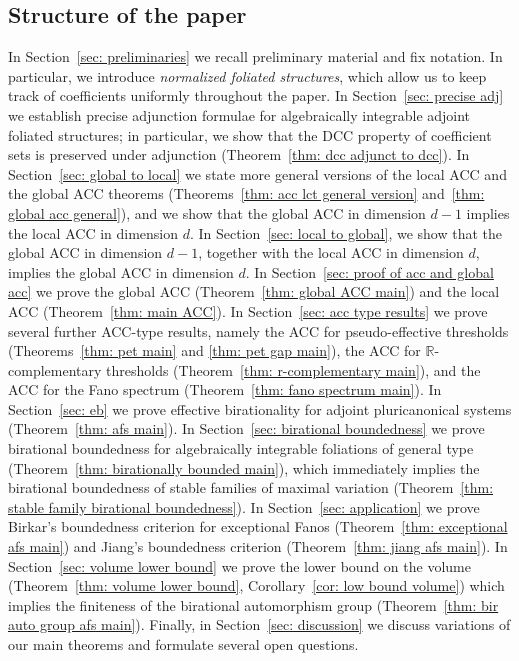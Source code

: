 \documentclass[11pt,reqno]{amsart}
\numberwithin{equation}{section}
\theoremstyle{definition}
\begin{document}
\subsection*{Structure of the paper}
In Section~\ref{sec: preliminaries} we recall preliminary material and fix notation. In particular, we introduce \emph{normalized foliated structures}, which allow us to keep track of coefficients uniformly throughout the paper. In Section~\ref{sec: precise adj} we establish precise adjunction formulae for algebraically integrable adjoint foliated structures; in particular, we show that the DCC property of coefficient sets is preserved under adjunction (Theorem~\ref{thm: dcc adjunct to dcc}). In Section~\ref{sec: global to local} we state more general versions of the local ACC and the global ACC theorems (Theorems~\ref{thm: acc lct general version} and~\ref{thm: global acc general}), and we show that the global ACC in dimension $d-1$ implies the local ACC in dimension $d$. In Section~\ref{sec: local to global}, we show that the global ACC in dimension $d-1$, together with the local ACC in dimension $d$, implies the global ACC in dimension $d$. In Section~\ref{sec: proof of acc and global acc} we prove the global ACC (Theorem~\ref{thm: global ACC main}) and the local ACC (Theorem~\ref{thm: main ACC}). In Section~\ref{sec: acc type results} we prove several further ACC-type results, namely the ACC for pseudo-effective thresholds (Theorems~\ref{thm: pet main} and \ref{thm: pet gap main}), the ACC for $\mathbb R$-complementary thresholds (Theorem~\ref{thm: r-complementary main}), and the ACC for the Fano spectrum (Theorem~\ref{thm: fano spectrum main}). In Section~\ref{sec: eb} we prove effective birationality for adjoint pluricanonical systems (Theorem~\ref{thm: afs main}). In Section~\ref{sec: birational boundedness} we prove birational boundedness for algebraically integrable foliations of general type (Theorem~\ref{thm: birationally bounded main}), which immediately implies the birational boundedness of stable families of maximal variation (Theorem~\ref{thm: stable family birational boundedness}). In Section~\ref{sec: application} we prove Birkar's boundedness criterion for exceptional Fanos (Theorem~\ref{thm: exceptional afs main}) and Jiang's boundedness criterion (Theorem~\ref{thm: jiang afs main}). In Section~\ref{sec: volume lower bound} we prove the lower bound on the volume (Theorem~\ref{thm: volume lower bound}, Corollary~\ref{cor: low bound volume}) which implies the finiteness of the birational automorphism group (Theorem~\ref{thm: bir auto group afs main}). Finally, in Section~\ref{sec: discussion} we discuss variations of our main theorems and formulate several open questions.
\end{document}

